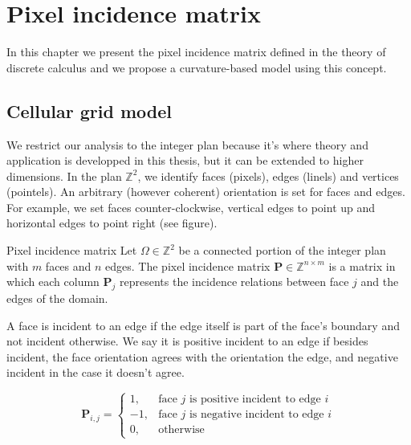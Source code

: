 \chapter{Pixel incidence matrix}
\label{app:pixel-incidence-matrix}

In this chapter we present the pixel incidence matrix defined in the theory of discrete calculus and we propose a curvature-based model using this concept.

\section{Cellular grid model}

We restrict our analysis to the integer plan because it's where theory and application is developped in this thesis, but it can be extended to higher dimensions. In the plan $\mathbb{Z}^2$, we identify faces (pixels), edges (linels) and vertices (pointels). An arbitrary (however coherent) orientation is set for faces and edges. For example, we set faces counter-clockwise, vertical edges to point up and horizontal edges to point right (see figure).

\begin{definition}{Pixel incidence matrix}
	Let $\Omega \in \mathbb{Z}^2$ be a connected portion of the integer plan with $m$ faces and $n$ edges. The pixel incidence matrix $\mathbf{P} \in \mathbb{Z}^{n \times m}$ is a matrix in which each column $\mathbf{P} _j$ represents the incidence relations between face $j$ and the edges of the domain.
\end{definition}

A face is incident to an edge if the edge itself is part of the face's boundary and not incident otherwise. We say it is positive incident to an edge if besides incident, the face orientation  agrees with the orientation the edge, and negative incident in the case it doesn't agree.

\[
\mathbf{P} _{i,j} = \left\{ \begin{array}{ll}
	1, & \text{face $j$ is positive incident to edge $i$}\\
	-1, & \text{face $j$ is negative incident to edge $i$}\\	
	0, & \text{otherwise}
\end{array}\right.
\]

